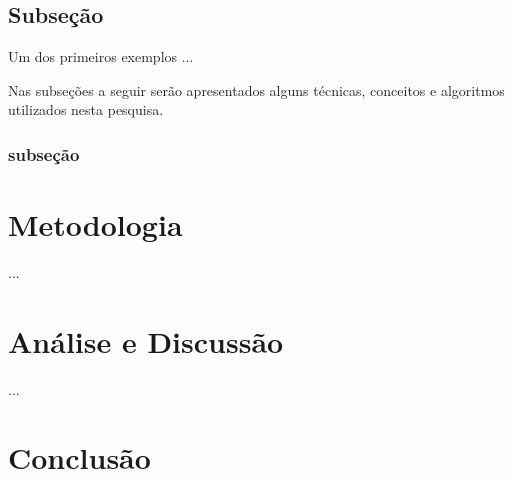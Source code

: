 \documentclass[12pt]{article}
\begin{document}
\subsection{Subseção}

Um dos primeiros exemplos ...


Nas subseções a seguir serão apresentados alguns técnicas, conceitos e algoritmos utilizados nesta pesquisa.

\subsubsection{subseção}


\section{Metodologia}

...


\section{Análise e Discussão}

...

\section{Conclusão}\label{sec:figs}



\end{document}
